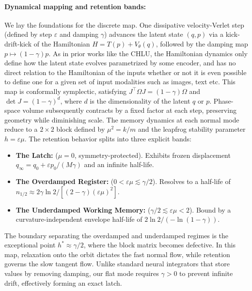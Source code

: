 \documentclass{article}
\begin{document}
\paragraph{Dynamical mapping and retention bands:} We lay the foundations for the discrete map. One dissipative velocity-Verlet step (defined by step $\varepsilon$ and damping $\gamma$) advances the latent state $(q,p)$ via a kick-drift-kick of the Hamiltonian $H=T(p)+V_\theta(q)$, followed by the damping map $p\mapsto(1-\gamma)p$. As in prior works like the CHLU, the Hamiltonian dynamics only define how the latent state evolves parametrized by some encoder, and has no direct relation to the Hamiltonian of the inputs whether or not it is even possible to define one for a given set of input modalities such as images, text etc. This map is conformally symplectic, satisfying $J^\top\Omega J=(1-\gamma)\Omega$ and $\det J=(1-\gamma)^d$, where $d$ is the dimensionality of the latent $q$ or $p$. Phase-space volume subsequently contracts by a fixed factor at each step, preserving geometry while diminishing scale. The memory dynamics at each normal mode reduce to a $2\times2$ block defined by $\mu^2=k/m$ and the leapfrog stability parameter $h=\varepsilon\mu$. The retention behavior splits into three explicit bands:
\begin{itemize}
    \item \textbf{The Latch:} ($\mu=0$, symmetry-protected). Exhibits frozen displacement $q_\infty=q_0+\varepsilon p_0/(M\gamma)$ and an infinite half-life.
    \item \textbf{The Overdamped Register:} ($0<\varepsilon\mu\lesssim\gamma/2$). Resolves to a half-life of $n_{1/2}\approx2\gamma\ln2/[(2-\gamma)(\varepsilon\mu)^2]$.
    \item \textbf{The Underdamped Working Memory:} ($\gamma/2\lesssim\varepsilon\mu<2$). Bound by a curvature-independent envelope half-life of $2\ln2/(-\ln(1-\gamma))$.
\end{itemize}
The boundary separating the overdamped and underdamped regimes is the exceptional point $h^*\approx\gamma/2$, where the block matrix becomes defective. In this map, relaxation onto the orbit dictates the fast normal flow, while retention governs the slow tangent flow. Unlike standard neural integrators that store values by removing damping, our flat mode requires $\gamma>0$ to prevent infinite drift, effectively forming an exact latch.
\end{document}
